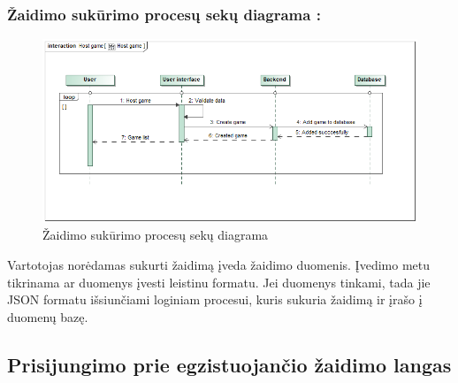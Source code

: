 \documentclass{VUMIFPSkursinis}
\begin{document}
		\subsubsection*{Žaidimo sukūrimo procesų sekų diagrama :}
			\begin{figure}[H]
				\centering
				\includegraphics[scale=0.5]{img/HostGame_sequence}
				\caption{Žaidimo sukūrimo procesų sekų diagrama}
				\label{img:Hostgame_sequence}
			\end{figure}
			Vartotojas norėdamas sukurti žaidimą įveda žaidimo duomenis. Įvedimo metu 
			tikrinama ar duomenys įvesti leistinu formatu. Jei duomenys tinkami, tada 
			jie JSON formatu išsiunčiami loginiam procesui, kuris sukuria žaidimą ir 
			įrašo į duomenų bazę.	
			
	\subsection{Prisijungimo prie egzistuojančio žaidimo langas}	
\end{document}
